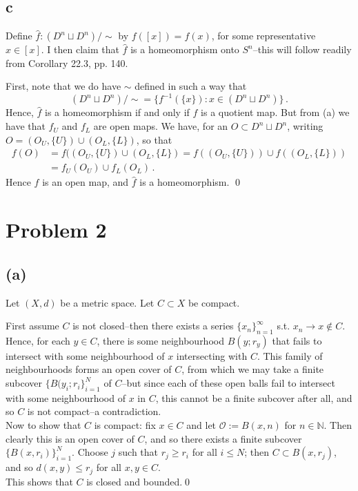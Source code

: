 \documentclass[11pt]{amsart}
\theoremstyle{definition}
\newcommand{\N}{\mathbb{N}}
\numberwithin{equation}{section}
\begin{document}
\subsection*{c}
Define $\hat{f}: (D^n \sqcup D^n) / \sim$ by $f([x]) = f(x)$, for some representative $x \in [x]$. I then claim that $\hat{f}$ is a homeomorphism onto $S^n$--this will follow readily from Corollary 22.3, pp. 140.

First, note that we do have $\sim$ defined in such a way that 
\begin{equation}
(D^n \sqcup D^n) / \sim = \{f^{-1}(\{x\}) : x\in (D^n \sqcup D^n)\}\,.
\end{equation}
Hence, $\hat{f}$ is a homeomorphism if and only if $f$ is a quotient map.
But from (a) we have that $f_U$ and $f_L$ are open maps. We have, for an $O \subset D^n \sqcup D^n$, writing $O = (O_U, \{U\}) \cup (O_L, \{L\})$, so that
\begin{align*}
f(O) &= f((O_U,\{U\}) \cup (O_L,\{L\}) = 
f((O_U,\{U\}))
\cup
f((O_L,\{L\})) \\
&= 
f_U(O_U) \cup f_L(O_L)\,.
\end{align*}
Hence $f$ is an open map, and $\hat{f}$ is a homeomorphism. \qed

\section{Problem 2}
\subsection*{(a)}
Let $(X, d)$ be a metric space. Let $C \subset X$ be compact.

First assume $C$ is not closed--then there exists a series $\{x_n\}_{n=1}^\infty$ s.t. $x_n \to x \notin C$. Hence, for each $y \in C$, there is some neighbourhood $B(y; r_y)$ that fails to intersect with some neighbourhood of $x$ intersecting with $C$. This family of neighbourhoods forms an open cover of $C$, from which we may take a finite subcover $\{B(y_i;r_i\}_{i=1}^N$ of $C$--but since each of these open balls fail to intersect with some neighbourhood of $x$ in $C$, this cannot be a finite subcover after all, and so $C$ is not compact--a contradiction.
\\

Now to show that $C$ is compact: fix $x \in C$ and let $\mathcal{O} := B(x, n)$ for $n \in \N$. Then clearly 
this is an open cover of $C$, and so there exists a finite subcover $\{B(x, r_i)\}_{i=1}^N$. Choose $j$ such that $r_j \geq r_i$ for all $i \leq N$; then $C \subset B(x, r_j)$, and so $d(x,y) \leq r_j$ for all $x,y \in C$.
\\
This shows that $C$ is closed and bounded.\qed
\end{document}
